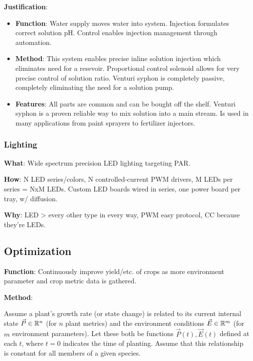 \documentclass{report}
\begin{document}
\textbf{Justification}: 
\begin{itemize}
    \item \textbf{Function}: Water supply moves water into system. Injection formulates correct solution pH. Control enables injection management through automation.
    \item \textbf{Method}: This system enables precise inline solution injection which eliminates need for a resevoir. Proportional control solenoid allows for very precise control of solution ratio. Venturi syphon is completely passive, completely eliminating the need for a solution pump. 
    \item \textbf{Features}: All parts are common and can be bought off the shelf. Venturi syphon is a proven reliable way to mix solution into a main stream. Is used in many applications from paint sprayers to fertilizer injectors.
\end{itemize}

\newpage


\subsubsection{Lighting}
\label{sec:lighting}

\textbf{What}: Wide spectrum precision LED lighting targeting PAR.

\textbf{How}: N LED series/colors, N controlled-current PWM drivers, M LEDs per series = NxM LEDs. Custom LED boards wired in series, one power board per tray, w/ diffusion.

\textbf{Why}: LED > every other type in every way, PWM easy protocol, CC because they’re LEDs.


\subsection{Optimization}
\label{sec:optimization}

\textbf{Function}: Continuously improve yield/etc. of crops as more environment parameter and crop metric data is gathered.

\textbf{Method}: 

Assume a plant's growth rate (or state change) is related to its current internal state $\vec P \in \mathbb R^n$ (for $n$ plant metrics) and the environment conditions $\vec E \in \mathbb R^m$ (for $m$ environment parameters). Let these both be functions $\vec P (t),\vec E(t)$ defined at each $t$, where $t=0$ indicates the time of planting. Assume that this relationship is constant for all members of a given species.
\end{document}
